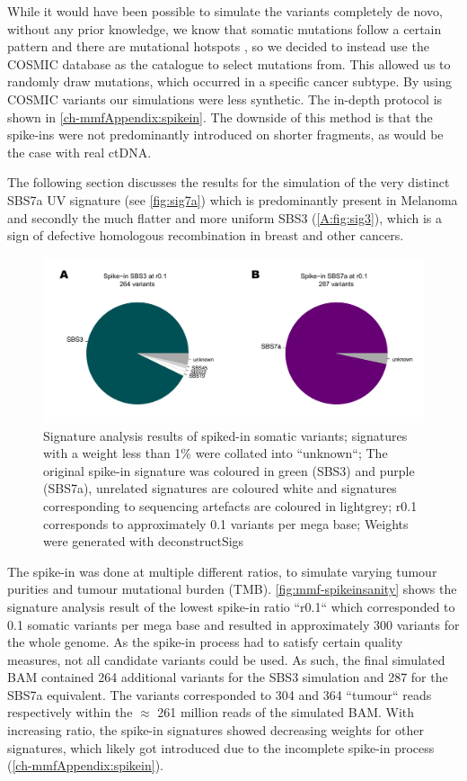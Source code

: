 While it would have been possible to simulate the variants completely de novo, without any prior knowledge, we know that somatic mutations follow a certain pattern and there are mutational hotspots \cite{Chen2016,Moore2021}, so we decided to instead use the COSMIC database \cite{Tate2018,WSI2021} as the catalogue to select mutations from. This allowed us to randomly draw mutations, which occurred in a specific cancer subtype. By using COSMIC variants our simulations were less synthetic. The in-depth protocol is shown in \autoref{ch-mmfAppendix:spikein}. The downside of this method is that the spike-ins were not predominantly introduced on shorter fragments, as would be the case with real ctDNA. 

The following section discusses the results for the simulation of the very distinct SBS7a UV signature (see \autoref{fig:sig7a}) which is predominantly present in Melanoma and secondly the much flatter and more uniform SBS3 (\autoref{A:fig:sig3}), which is a sign of defective homologous recombination in breast and other cancers. 


\begin{figure}[ht]
\centering
\includegraphics[width=.9\linewidth]{Figures/MisMatchFinder/spikeInSanityCheck.pdf}
\caption[Signature analysis of spike-in somatic variants]{Signature analysis results of spiked-in somatic variants; signatures with a weight less than 1\% were collated into ``unknown``; The original spike-in signature was coloured in green (SBS3) and purple (SBS7a), unrelated signatures are coloured white and signatures corresponding to sequencing artefacts are coloured in lightgrey; r0.1 corresponds to approximately 0.1 variants per mega base; Weights were generated with deconstructSigs \cite{Rosenthal2016} }\label{fig:mmf-spikeinsanity}
\end{figure}

The spike-in was done at multiple different ratios, to simulate varying tumour purities and tumour mutational burden (TMB). \autoref{fig:mmf-spikeinsanity} shows the signature analysis result of the lowest spike-in ratio ``r0.1`` which corresponded to 0.1 somatic variants per mega base and resulted in approximately 300 variants for the whole genome. As the spike-in process had to satisfy certain quality measures, not all candidate variants could be used. As such, the final simulated BAM contained 264 additional variants for the SBS3 simulation and 287 for the SBS7a equivalent. The variants corresponded to 304 and 364 ``tumour`` reads respectively within the $\approx$ 261 million reads of the simulated BAM. With increasing ratio, the spike-in signatures showed decreasing weights for other signatures, which likely got introduced due to the incomplete spike-in process (\autoref{ch-mmfAppendix:spikein}).


